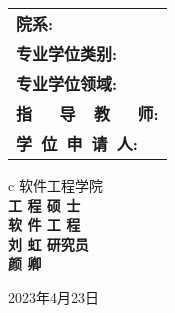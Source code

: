 \begin{center}
	\renewcommand\arraystretch{1.5}
	\begin{tabular}{l}
		{\sihao \bf 院\qquad\qquad 系:} \\
		{\sihao \bf 专业学位类别:}      \\
		{\sihao \bf 专业学位领域:}      \\
		{\sihao \bf 指~~~导~~教~~~师:}      \\
		{\sihao \bf 学~位~申~请~人:}
	\end{tabular}
	\begin{tabular}c
		{\sihao \bf }软件工程学院 \\
		\hline {\sihao \bf }
		\bf 工 \bf 程 \bf 硕 \bf 士  \\
		\hline {\sihao \bf }
		\bf 软 \bf 件 \bf 工 \bf 程 \\
		\hline {\sihao \bf }
		\bf 刘 \bf 虹 \bf 研究员 \\
		\hline {\sihao \bf }
		\bf 颜 \bf 卿 \\
		\hline
	\end{tabular}
\end{center}

\vskip 2.0cm

\begin{center}
	{\sihao 2023年4月23日}
\end{center}
